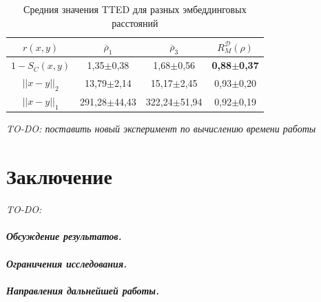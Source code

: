 \documentclass[12pt]{article}
\begin{document}
\begin{table}[h]
    \centering
    \begin{tabular}{c|c|c|c}
        $r(x, y)$ & $\overline{\rho}_1$ & $\overline{\rho}_3$ & $R_M^\mathcal{D}(\rho)$ \\ \hline
        $1 - S_C(x, y)$ & 1,35$\pm$0,38 & 1,68$\pm$0,56 & \textbf{0,88$\pm$0,37} \\ \hline
        $||x-y||_2$ & 13,79$\pm$2,14 & 15,17$\pm$2,45 & 0,93$\pm$0,20 \\ \hline
        $||x-y||_1$ & 291,28$\pm$44,43 & 322,24$\pm$51,94 & 0,92$\pm$0,19
    \end{tabular}
    \caption{Средния значения TTED для разных эмбеддинговых расстояний}
    \label{tab:modification_results}
\end{table}

\textit{TO-DO: поставить новый эксперимент по вычислению времени работы}

        
\newpage
\section*{Заключение}

\textit{TO-DO:}
\paragraph{\textit{Обсуждение результатов.}}
\paragraph{\textit{Ограничения исследования.}}
\paragraph{\textit{Направления дальнейшей работы.}}
\end{document}
